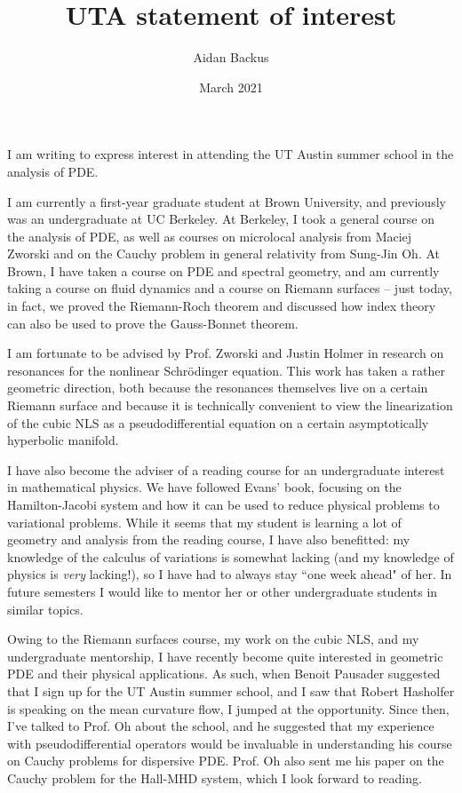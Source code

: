 \documentclass[reqno,12pt,letterpaper]{amsart}
\title[Statement of interest for UT Austin summer school]{UTA statement of interest}
\author{Aidan Backus}
\date{March 2021}
\theoremstyle{definition}
\begin{document}

\maketitle



I am writing to express interest in attending the UT Austin summer school in the analysis of PDE.

I am currently a first-year graduate student at Brown University, and previously was an undergraduate at UC Berkeley.
At Berkeley, I took a general course on the analysis of PDE, as well as courses on microlocal analysis from Maciej Zworski and on the Cauchy problem in general relativity from Sung-Jin Oh.
At Brown, I have taken a course on PDE and spectral geometry, and am currently taking a course on fluid dynamics and a course on Riemann surfaces -- just today, in fact, we proved the Riemann-Roch theorem and discussed how index theory can also be used to prove the Gauss-Bonnet theorem.

I am fortunate to be advised by Prof. Zworski and Justin Holmer in research on resonances for the nonlinear Schr\"odinger equation.
This work has taken a rather geometric direction, both because the resonances themselves live on a certain Riemann surface and because it is technically convenient to view the linearization of the cubic NLS as a pseudodifferential equation on a certain asymptotically hyperbolic manifold.

I have also become the adviser of a reading course for an undergraduate interest in mathematical physics.
We have followed Evans' book, focusing on the Hamilton-Jacobi system and how it can be used to reduce physical problems to variational problems.
While it seems that my student is learning a lot of geometry and analysis from the reading course, I have also benefitted: my knowledge of the calculus of variations is somewhat lacking (and my knowledge of physics is \emph{very} lacking!), so I have had to always stay ``one week ahead" of her.
In future semesters I would like to mentor her or other undergraduate students in similar topics.

Owing to the Riemann surfaces course, my work on the cubic NLS, and my undergraduate mentorship, I have recently become quite interested in geometric PDE and their physical applications.
As such, when Benoit Pausader suggested that I sign up for the UT Austin summer school, and I saw that Robert Hasholfer is speaking on the mean curvature flow, I jumped at the opportunity.
Since then, I've talked to Prof. Oh about the school, and he suggested that my experience with pseudodifferential operators would be invaluable in understanding his course on Cauchy problems for dispersive PDE.
Prof. Oh also sent me his paper on the Cauchy problem for the Hall-MHD system, which I look forward to reading.
\end{document}
